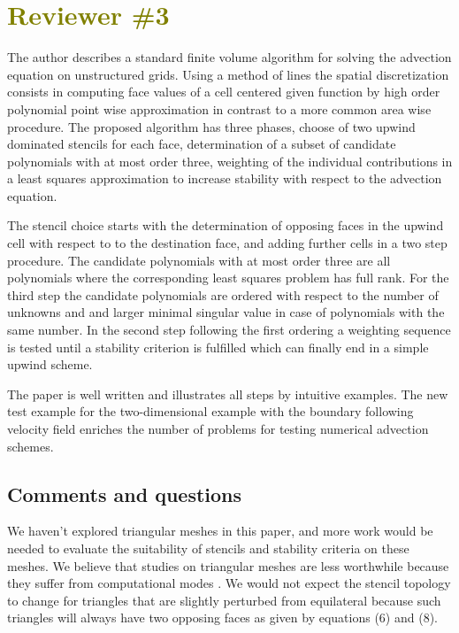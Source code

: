 \documentclass[times]{elsarticle}
\newcommand{\revthree}[1]{\textcolor{olive}{\textbf{#1}}}
\begin{document}
\section*{\revthree{Reviewer \#3}}
The author describes  a standard finite volume algorithm for solving the advection equation on unstructured
grids. Using a method of lines the spatial discretization consists in computing face values of a cell
centered given function by high order polynomial point wise approximation in contrast to a more common
area wise procedure. The proposed algorithm has three phases, choose of two upwind dominated stencils
for each face, determination of a subset of candidate polynomials with at most order three, weighting
of the individual contributions in a least squares approximation to increase stability with respect 
to the advection equation.

The stencil choice starts with the determination of opposing faces in the upwind cell with respect to 
to the destination face, and adding further cells in a two step procedure. The candidate polynomials
with at most order three are all polynomials where the corresponding least squares problem has full rank.
For the third step the candidate polynomials are ordered with respect to the number of unknowns and 
and larger minimal singular value in case of polynomials with the same number. In the second step
following the first ordering a weighting sequence is tested until a stability criterion is fulfilled
which can finally end in a simple upwind scheme. 

The paper is well written and illustrates all steps by intuitive examples. The new test example
for the two-dimensional example with the boundary following velocity field enriches the number of
problems for testing numerical advection schemes.

\subsection*{Comments and questions}

\begin{quotation}
\begin{comment}
\setcounter{commenti}{0}
\item Can you comment on the stencil for triangular grids. In case of a slightly perturbed triangular grid
with  equilateral triangles the stencil changes in comparison the unperturbed case.
\end{comment}
\end{quotation}
We haven't explored triangular meshes in this paper, and more work would be needed to evaluate the suitability of stencils and stability criteria on these meshes.
We believe that studies on triangular meshes are less worthwhile because they suffer from computational modes \citep{weller2012}.
We would not expect the stencil topology to change for triangles that are slightly perturbed from equilateral because such triangles will always have two opposing faces as given by equations (6) and (8).
\end{document}
